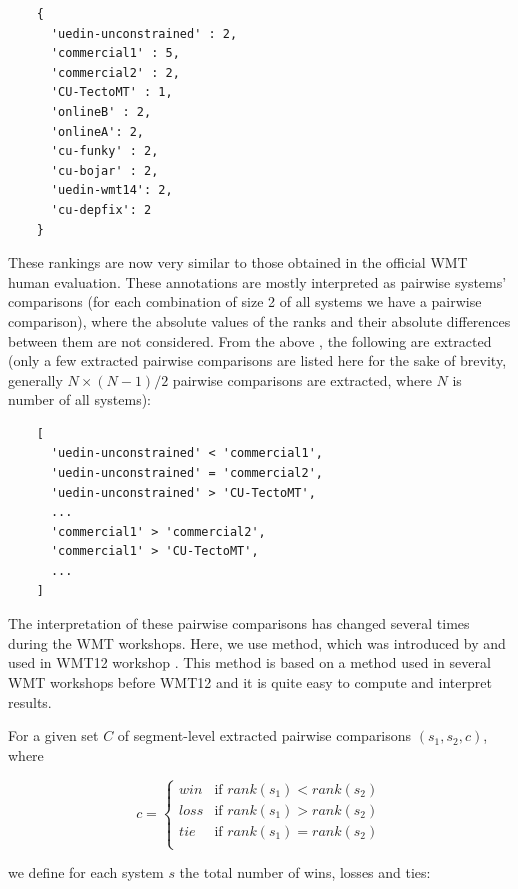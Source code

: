 \begin{verbatim}
    {
      'uedin-unconstrained' : 2,
      'commercial1' : 5,
      'commercial2' : 2,
      'CU-TectoMT' : 1,
      'onlineB' : 2,
      'onlineA': 2,
      'cu-funky' : 2,
      'cu-bojar' : 2,
      'uedin-wmt14': 2,
      'cu-depfix': 2
    }
\end{verbatim}

These rankings are now very similar to those obtained in the official WMT human
evaluation. These annotations are mostly interpreted as pairwise systems'
comparisons (for each combination of size 2 of all systems we have a pairwise
comparison), where the absolute values of the ranks and their absolute
differences between them are not considered. From the above , the following  are extracted (only
a few extracted pairwise comparisons are listed here for the sake of brevity,
generally $N \times (N-1) / 2$ pairwise comparisons are extracted, where $N$ is
number of all systems):

\begin{verbatim}
    [
      'uedin-unconstrained' < 'commercial1',
      'uedin-unconstrained' = 'commercial2',
      'uedin-unconstrained' > 'CU-TectoMT',
      ...
      'commercial1' > 'commercial2',
      'commercial1' > 'CU-TectoMT',
      ...
    ]
\end{verbatim}

The interpretation of these pairwise comparisons has changed several times
during the WMT workshops. Here, we use 
method, which was introduced by  and used in
WMT12 workshop . This method is based on a method
used in several WMT workshops before WMT12 and it is quite easy to compute and
interpret results.

For a given set $C$ of segment-level extracted pairwise comparisons
$(s_1,s_2,c)$, where 

\begin{equation*}
c = \begin{cases}
  win  & \text{if $rank(s_1) < rank(s_2)$} \\
  loss & \text{if $rank(s_1) > rank(s_2)$} \\
  tie  & \text{if $rank(s_1) = rank(s_2)$} \\
    \end{cases}
\end{equation*}

\noindent we define for each system $s$ the total number of wins, losses and ties:

